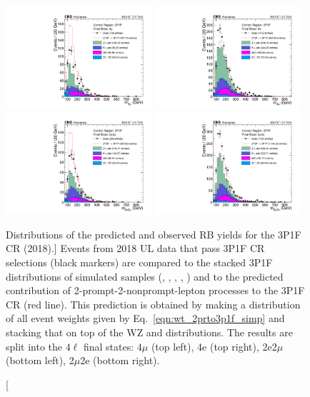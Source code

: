 \begin{figure}[!htbp]
	\begin{center}
		\includegraphics[width=0.48\textwidth]{figures/higgsmassmeas/redbkg/cr/UL2018_CR_3P1F_4mu.pdf}
		\includegraphics[width=0.48\textwidth]{figures/higgsmassmeas/redbkg/cr/UL2018_CR_3P1F_4e.pdf}
		\includegraphics[width=0.48\textwidth]{figures/higgsmassmeas/redbkg/cr/UL2018_CR_3P1F_2e2mu.pdf}
		\includegraphics[width=0.48\textwidth]{figures/higgsmassmeas/redbkg/cr/UL2018_CR_3P1F_2mu2e.pdf}
		\caption
			[Distributions of the predicted and observed RB yields for the 3P1F CR (2018).]
			{
			Events from 2018 UL data that pass 3P1F CR selections (black markers) 
			are compared to the stacked 3P1F distributions of simulated samples
			(\Zplusjets, \ttbarplusjets, \WZ, \ZZ, \Zgammastar)
			and to the predicted contribution of 2-prompt-2-nonprompt-lepton processes to the 3P1F CR (red line).
			This prediction is obtained by making a distribution of all event weights given by Eq.~\ref{eqn:wt_2prto3p1f_simp} and stacking that on top of the WZ and \ZZ distributions.
			The results are split into the $4\ell$ final states:
			$4\mu$ (top left), 4e (top right), 2e2$\mu$ (bottom left), 2$\mu$2e (bottom right).
			}
		\label{cr_plots_3p1f_2018}
	\end{center}
\end{figure}

